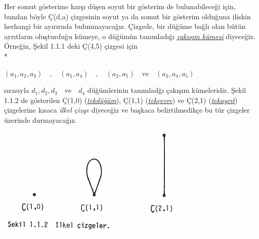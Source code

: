 \documentclass[11pt]{amsbook}
\begin{document}

Her somut gösterime karşı düşen soyut bir gösterim
de bulunabileceği için, bundan böyle Ç(d,a)
çizgesinin soyut ya da somut bir gösterim olduğuna
iliskin herhangi bir ayırırnda bulunmayacağız.
Çizgede, bir düğüme bağlı olan bütün ayrıtların
oluşturduğu kümeye, o düğümün tanımladığı 
\underline{\emph{çakışım kümesi}} diyeceğiz. Örneğin, Şekil 1.1.1 deki Ç(4,5) çizgesi için \\*
\begin{center} $(a_{1},a_{2},a_{3})\quad  ,\quad  (a_{1},a_{4})\quad  ,\quad  (a_{2},a_{5})  \quad \textrm{ve} \quad (a_{3},a_{4},a_{5}) $ \end{center} 
sırasıyla $d_{1},d_{2},d_{3}  \quad \textrm{ve} \quad d_{4}$ düğümlerinin tanımladğı çakışım kümeleridir. Şekil 1.1.2 de gösterilen Ç(1,0) (\underline{\emph{tekdüğüm}}), Ç(1,1) (\underline{\emph{tekçevre}}) ve Ç(2,1) (\underline{\emph{tekayrıt}})  çizgelerine kısaca \emph{ilkel çizge} diyeceğiz ve başkaca belirtilmedikçe bu tür
çizgeler üzerinde durmayacağız. 
\begin{center}
\includegraphics{images/ceyhun-3-figure-1}
\end{center}
\end{document}
